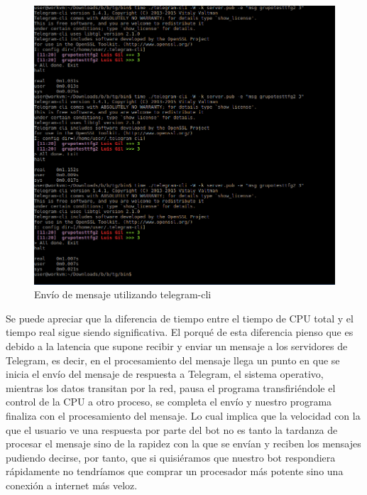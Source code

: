 \begin{figure}[H] %
\centering
\includegraphics[scale=0.4]{imagenes/random/Screenshot_2017-09-01_11-21-38}  %
\caption{Envío de mensaje utilizando telegram-cli}\label{figura94}
\end{figure}

Se puede apreciar que la diferencia de tiempo entre el tiempo de CPU total y el tiempo real sigue siendo significativa. El porqué de esta diferencia pienso que es debido a la latencia que supone recibir y enviar un mensaje a los servidores de Telegram, es decir, en el procesamiento del mensaje llega un punto en que se inicia el envío del mensaje de respuesta a Telegram, el sistema operativo, mientras los datos transitan por la red, pausa el programa transfiriéndole el control de la CPU a otro proceso, se completa el envío y nuestro programa finaliza con el procesamiento del mensaje.
Lo cual implica que la velocidad con la que el usuario ve una respuesta por parte del bot no es tanto la tardanza de procesar el mensaje sino de la rapidez con la que se envían y reciben los mensajes pudiendo decirse, por tanto, que si quisiéramos que nuestro bot respondiera rápidamente no tendríamos que comprar un procesador más potente sino una conexión a internet más veloz.
